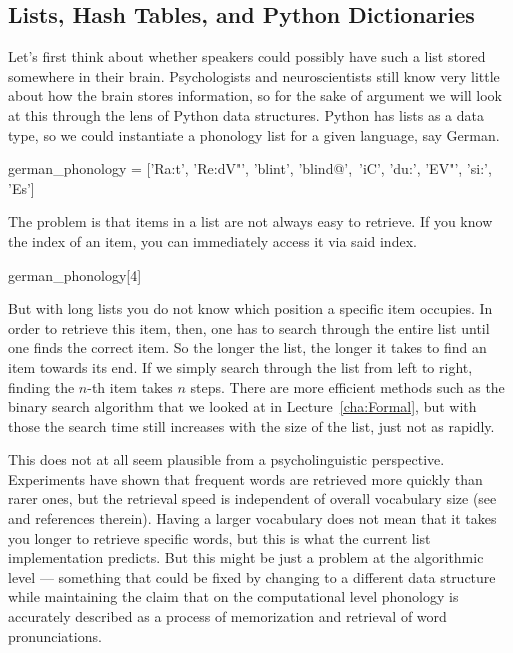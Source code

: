 \subsection{Lists, Hash Tables, and Python Dictionaries}

Let's first think about whether speakers could possibly have such a list stored somewhere in their brain.
Psychologists and neuroscientists still know very little about how the brain stores information, so for the sake of argument we will look at this through the lens of Python data structures.
Python has lists as a data type, so we could instantiate a phonology list for a given language, say German.
%
\begin{center}
    \begin{pythoncode}
        german_phonology = ['Ra:t', 'Re:dV"', 'blint', 'blind@',\
                            'iC', 'du:', 'EV"', 'si:', 'Es']
    \end{pythoncode}
\end{center}
%
The problem is that items in a list are not always easy to retrieve.
If you know the index of an item, you can immediately access it via said index.
%
\begin{center}
    \begin{pythoncode}
        german_phonology[4]
    \end{pythoncode}
\end{center}
%
But with long lists you do not know which position a specific item occupies.
In order to retrieve this item, then, one has to search through the entire list until one finds the correct item.
So the longer the list, the longer it takes to find an item towards its end.
If we simply search through the list from left to right, finding the $n$-th item takes $n$ steps.
There are more efficient methods such as the binary search algorithm that we looked at in Lecture~\ref{cha:Formal}, but with those the search time still increases with the size of the list, just not as rapidly.

This does not at all seem plausible from a psycholinguistic perspective.
Experiments have shown that frequent words are retrieved more quickly than rarer ones, but the retrieval speed is independent of overall vocabulary size (see \citealt{Jurasfky03} and references therein).
Having a larger vocabulary does not mean that it takes you longer to retrieve specific words, but this is what the current list implementation predicts.
But this might be just a problem at the algorithmic level --- something that could be fixed by changing to a different data structure while maintaining the claim that on the computational level phonology is accurately described as a process of memorization and retrieval of word pronunciations.

